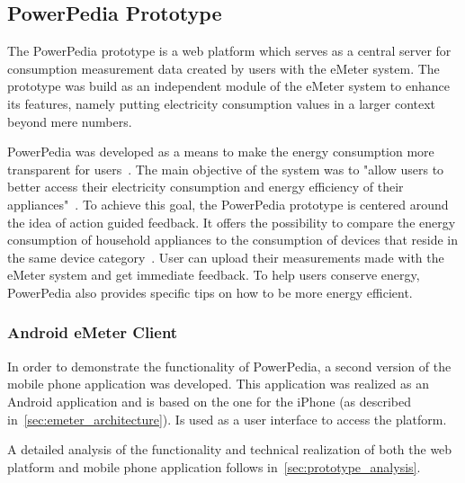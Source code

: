 \subsection{PowerPedia Prototype}
The PowerPedia prototype is a web platform which serves as a central server for consumption measurement data created by users with the eMeter system. The prototype was build as an independent module of the eMeter system to enhance its features, namely putting electricity consumption values in a larger context beyond mere numbers.

PowerPedia was developed as a means to make the energy consumption more transparent for users~\cite{merklepp}. The main objective of the system was to "allow users to better access their electricity consumption and energy efficiency of their appliances"~\cite{weiss:inprocPUC:2012}. To achieve this goal, the PowerPedia prototype is centered around the idea of action guided feedback. It offers the possibility to compare the energy consumption of household appliances to the consumption of devices that reside in the same device category~\cite{merklepp}. User can upload their measurements made with the eMeter system and get immediate feedback. To help users conserve energy, PowerPedia also provides specific tips on how to be more energy efficient.

\subsubsection{Android eMeter Client}
In order to demonstrate the functionality of PowerPedia, a second version of the mobile phone application was developed. This application was realized as an Android application and is based on the one for the iPhone (as described in~\ref{sec:emeter_architecture}). Is used as a user interface to access the platform.

A detailed analysis of the functionality and technical realization of both the web platform and mobile phone application follows in~\ref{sec:prototype_analysis}.